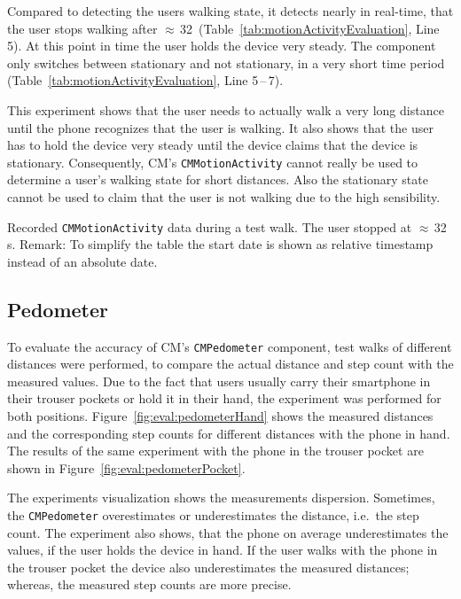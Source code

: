 Compared to detecting the users walking state, it detects nearly in real-time, that the user stops walking after $\approx$\,32\, (Table~\ref{tab:motionActivityEvaluation}, Line 5). At this point in time the user holds the device very steady. The component only switches between stationary and not stationary, in a very short time period (Table~\ref{tab:motionActivityEvaluation}, Line 5\,--\,7).

This experiment shows that the user needs to actually walk a very long distance until the phone recognizes that the user is walking. It also shows that the user has to hold the device very steady until the device claims that the device is stationary. Consequently, \ac{CM}'s \texttt{CMMotionActivity} cannot really be used to determine a user's walking state for short distances. Also the stationary state cannot be used to claim that the user is not walking due to the high sensibility.

\begin{table}
	
	\caption{Recorded \texttt{CMMotionActivity} data during a test walk. The user stopped at $\approx$\,32\,s. Remark: To simplify the table the start date is shown as relative timestamp instead of an absolute date.}
	\label{tab:motionActivityEvaluation}
\end{table}


\subsection{Pedometer}
To evaluate the accuracy of \ac{CM}'s \texttt{CMPedometer} component, test walks of different distances  were performed, to compare the actual distance and step count with the measured values. Due to the fact that users usually carry their smartphone in their trouser pockets or hold it in their hand, the experiment was performed for both positions. Figure~\ref{fig:eval:pedometerHand} shows the measured distances and the corresponding step counts for different distances with the phone in hand. The results of the same experiment with the phone in the trouser pocket are shown in Figure~\ref{fig:eval:pedometerPocket}.

The experiments visualization shows the measurements dispersion. Sometimes, the \texttt{CMPedometer} overestimates or underestimates the distance, i.e.\ the step count. The experiment also shows, that the phone on average underestimates the values, if the user holds the device in hand. If the user walks with the phone in the trouser pocket the device also underestimates the measured distances; whereas, the measured step counts are more precise.


